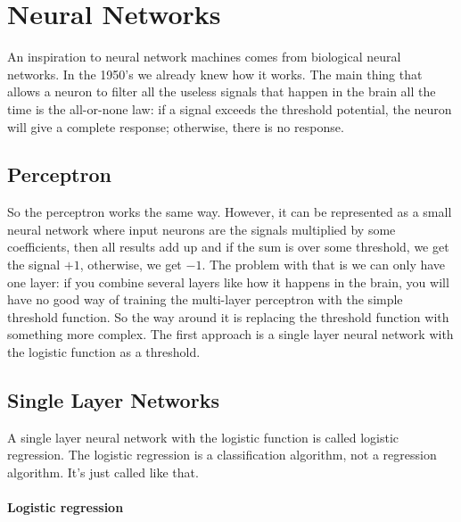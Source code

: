 \chapter{Neural Networks}

{\sf An inspiration to neural network machines comes from biological neural networks. In the 1950's we already knew how it works. The main thing that allows a neuron to filter all the useless signals that happen in the brain all the time is the all-or-none law: if a signal exceeds the threshold potential, the neuron will give a complete response; otherwise, there is no response.}

\section{Perceptron}

So the perceptron works the same way. However, it can be represented as a small neural network where input neurons are the signals multiplied by some coefficients, then all results add up and if the sum is over some threshold, we get the signal $+1$, otherwise, we get $-1$. The problem with that is we can only have one layer: if you combine several layers like how it happens in the brain, you will have no good way of training the multi-layer perceptron with the simple threshold function. So the way around it is replacing the threshold function with something more complex. The first approach is a single layer neural network with the logistic function as a threshold.

\section{Single Layer Networks}

A single layer neural network with the logistic function is called logistic regression. The logistic regression is a classification algorithm, not a regression algorithm. It's just called like that.

\subsubsection*{Logistic regression}

